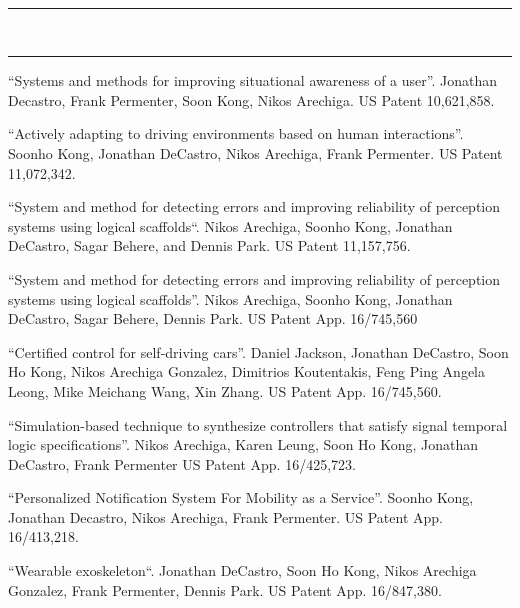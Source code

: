 \documentclass[10pt, letterpaper]{article}
\newcommand{\interval}[2]
{#1 -- \makebox[1.5cm]{\hfill#2}}
\newcommand{\amper}{{\fontspec[Scale=.95]{Adobe Caslon Pro}\selectfont\itshape\&}\xspace}
\newcommand{\mysection}[1]{
  \vspace{20pt}\noindent{\rmfamily\mdseries \Large #1}\\
  \vspace{-6pt}\hrule\vspace{3pt}
}
\begin{document}

\mysection{Publications}


\nocite{*}
\printbibliography[heading=none]

\mysection{Patents}

\begin{thebibliography}{9}

 ``Systems and methods for improving situational awareness of a user''.
Jonathan Decastro, Frank Permenter, Soon Kong, Nikos Arechiga.
US Patent 10,621,858.

 ``Actively adapting to driving environments based on human interactions''.
Soonho Kong, Jonathan DeCastro, Nikos Arechiga, Frank Permenter.
US Patent 11,072,342.

 ``System and method for detecting errors and improving reliability of perception systems using logical scaffolds``.
Nikos Arechiga, Soonho Kong, Jonathan DeCastro, Sagar Behere, and Dennis Park.
US Patent 11,157,756.

 ``System and method for detecting errors and improving reliability of perception systems using logical scaffolds''.
  Nikos Arechiga, Soonho Kong, Jonathan DeCastro, Sagar Behere, Dennis Park.
  US Patent App. 16/745,560

 ``Certified control for self-driving cars''.
  Daniel Jackson, Jonathan DeCastro, Soon Ho Kong, Nikos Arechiga Gonzalez, Dimitrios Koutentakis, Feng Ping Angela Leong, Mike Meichang Wang, Xin Zhang.
  US Patent App. 16/745,560.

 ``Simulation-based technique to synthesize controllers that satisfy signal temporal logic specifications''.
Nikos Arechiga, Karen Leung, Soon Ho Kong, Jonathan DeCastro, Frank Permenter
US Patent App. 16/425,723.

 ``Personalized Notification System For Mobility as a Service''.
Soonho Kong, Jonathan Decastro, Nikos Arechiga, Frank Permenter.
US Patent App. 16/413,218.

 ``Wearable exoskeleton``.
Jonathan DeCastro, Soon Ho Kong, Nikos Arechiga Gonzalez, Frank Permenter, Dennis Park.
US Patent App. 16/847,380.

\end{thebibliography}


\end{document}
